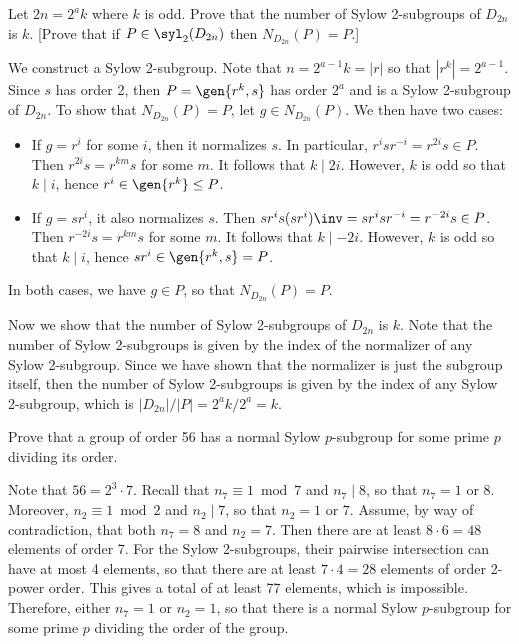 \begin{exercise}\label{ex4.5.12}
	Let $2n = 2^ak$ where $k$ is odd. Prove that the number of Sylow 2-subgroups of $D_{2n}$ is $k$. [Prove that if $P \in \syl_2(D_{2n})$ then $N_{D_{2n}}(P) = P$.]
\end{exercise}

\begin{sol}
	We construct a Sylow 2-subgroup. Note that $n = 2^{a - 1}k = |r|$ so that $|r^k| = 2^{a - 1}$. Since $s$ has order 2, then $P = \gen{r^k, s}$ has order $2^a$ and is a Sylow 2-subgroup of $D_{2n}$. To show that $N_{D_{2n}}(P) = P$, let $g \in N_{D_{2n}}(P)$. We then have two cases:
	\begin{itemize}
		\item If $g = r^i$ for some $i$, then it normalizes $s$. In particular, $r^isr^{-i} = r^{2i}s \in P$. Then $r^{2i}s = r^{km}s$ for some $m$. It follows that $k \mid 2i$. However, $k$ is odd so that $k \mid i$, hence $r^i \in \gen{r^k} \leq P$.
		\item If $g = sr^i$, it also normalizes $s$. Then $sr^is(sr^i)\inv = sr^isr^{-i} = r^{-2i}s \in P$. Then $r^{-2i}s = r^{km}s$ for some $m$. It follows that $k \mid -2i$. However, $k$ is odd so that $k \mid i$, hence $sr^i \in \gen{r^k, s} = P$.
	\end{itemize}
	In both cases, we have $g \in P$, so that $N_{D_{2n}}(P) = P$.

	Now we show that the number of Sylow 2-subgroups of $D_{2n}$ is $k$. Note that the number of Sylow 2-subgroups is given by the index of the normalizer of any Sylow 2-subgroup. Since we have shown that the normalizer is just the subgroup itself, then the number of Sylow 2-subgroups is given by the index of any Sylow 2-subgroup, which is $|D_{2n}|/|P| = 2^ak/2^a = k$. 
\end{sol}

\begin{exercise}\label{ex4.5.13}
	Prove that a group of order 56 has a normal Sylow $p$-subgroup for some prime $p$ dividing its order.
\end{exercise}

\begin{sol}
	Note that $56 = 2^3 \cdot 7$. Recall that $n_7 \equiv 1 \bmod 7$ and $n_7 \mid 8$, so that $n_7 = 1$ or $8$. Moreover, $n_2 \equiv 1 \bmod 2$ and $n_2 \mid 7$, so that $n_2 = 1$ or $7$. Assume, by way of contradiction, that both $n_7 = 8$ and $n_2 = 7$. Then there are at least $8 \cdot 6 = 48$ elements of order 7. For the Sylow 2-subgroups, their pairwise intersection can have at most 4 elements, so that there are at least $7 \cdot 4 = 28$ elements of order 2-power order. This gives a total of at least 77 elements, which is impossible. Therefore, either $n_7 = 1$ or $n_2 = 1$, so that there is a normal Sylow $p$-subgroup for some prime $p$ dividing the order of the group.
\end{sol}

